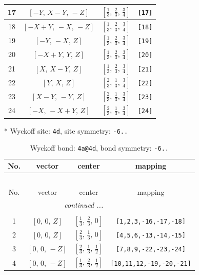 \documentclass[fleqn,8pt]{jsarticle}
\begin{document}
\begin{longtable}{cccc}
17 & $\left[ - Y,\, X - Y,\, - Z \right]$ & $\left[ \frac{1}{3},\, \frac{2}{3},\, \frac{3}{4} \right]$ & {\tt [17]} \\ \hline
18 & $\left[ - X + Y,\, - X,\, - Z \right]$ & $\left[ \frac{1}{3},\, \frac{2}{3},\, \frac{3}{4} \right]$ & {\tt [18]} \\ \hline
19 & $\left[ - Y,\, - X,\, Z \right]$ & $\left[ \frac{1}{3},\, \frac{2}{3},\, \frac{3}{4} \right]$ & {\tt [19]} \\ \hline
20 & $\left[ - X + Y,\, Y,\, Z \right]$ & $\left[ \frac{1}{3},\, \frac{2}{3},\, \frac{3}{4} \right]$ & {\tt [20]} \\ \hline
21 & $\left[ X,\, X - Y,\, Z \right]$ & $\left[ \frac{1}{3},\, \frac{2}{3},\, \frac{3}{4} \right]$ & {\tt [21]} \\ \hline
22 & $\left[ Y,\, X,\, Z \right]$ & $\left[ \frac{2}{3},\, \frac{1}{3},\, \frac{3}{4} \right]$ & {\tt [22]} \\ \hline
23 & $\left[ X - Y,\, - Y,\, Z \right]$ & $\left[ \frac{2}{3},\, \frac{1}{3},\, \frac{3}{4} \right]$ & {\tt [23]} \\ \hline
24 & $\left[ - X,\, - X + Y,\, Z \right]$ & $\left[ \frac{2}{3},\, \frac{1}{3},\, \frac{3}{4} \right]$ & {\tt [24]} \\
\end{longtable}
* Wyckoff site: {\tt 4d}, site symmetry: {\tt -6..}
\renewcommand{\arraystretch}{1.2}
\begin{longtable}{cccc}
\caption{Wyckoff bond: {\tt 4a@4d}, bond symmetry: {\tt -6..}}
 \\
 \hline \hline
No. & vector & center & mapping \\ \hline \endfirsthead

\multicolumn{3}{l}{\tablename\ \thetable{}} \\
 \hline \hline
No. & vector & center & mapping \\ \hline \endhead

 \hline \hline
\multicolumn{3}{r}{\footnotesize\it continued ...} \\ \endfoot

 \hline \hline
\multicolumn{3}{r}{} \\ \endlastfoot

1 & $\left[ 0,\, 0,\, Z \right]$ & $\left[ \frac{1}{3},\, \frac{2}{3},\, 0 \right]$ & {\tt [1,2,3,-16,-17,-18]} \\ \hline
2 & $\left[ 0,\, 0,\, Z \right]$ & $\left[ \frac{2}{3},\, \frac{1}{3},\, 0 \right]$ & {\tt [4,5,6,-13,-14,-15]} \\ \hline
3 & $\left[ 0,\, 0,\, - Z \right]$ & $\left[ \frac{2}{3},\, \frac{1}{3},\, \frac{1}{2} \right]$ & {\tt [7,8,9,-22,-23,-24]} \\ \hline
4 & $\left[ 0,\, 0,\, - Z \right]$ & $\left[ \frac{1}{3},\, \frac{2}{3},\, \frac{1}{2} \right]$ & {\tt [10,11,12,-19,-20,-21]} \\
\end{longtable}
\end{document}
